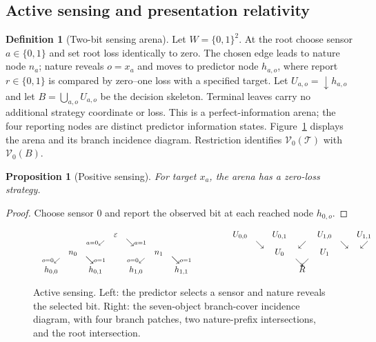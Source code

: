 \documentclass[11pt]{article}
\theoremstyle{plain}
\newtheorem{proposition}[theorem]{Proposition}
\theoremstyle{definition}
\newtheorem{definition}[theorem]{Definition}
\theoremstyle{remark}
\begin{document}
\subsection{Active sensing and presentation relativity}

\begin{definition}[Two-bit sensing arena]\label{def:sensing}
Let $W=\{0,1\}^2$. At the root choose sensor $a\in\{0,1\}$ and set root loss
identically to zero. The chosen edge leads to nature node $n_a$; nature reveals
$o=x_a$ and moves to predictor node
$h_{a,o}$, where report $r\in\{0,1\}$ is compared by zero--one loss with a
specified target. Let
$U_{a,o}=\downarrow h_{a,o}$ and let
$B=\bigcup_{a,o}U_{a,o}$ be the decision skeleton. Terminal leaves carry no
additional strategy coordinate or loss. This is a perfect-information arena; the
four reporting nodes are distinct predictor information states. Figure~\ref{fig:sensing} displays the arena and its branch incidence diagram. Restriction identifies
$\mathscr V_0(\mathcal T)$ with $\mathscr V_0(B)$.
\end{definition}

\begin{proposition}[Positive sensing]\label{prop:sensing-positive}
For target $x_a$, the arena has a zero-loss strategy.
\end{proposition}

\begin{proof}
Choose sensor $0$ and report the observed bit at each reached node $h_{0,o}$.
\end{proof}

\begin{figure}[htbp]
\centering
\[
\begin{array}{c@{\qquad\qquad}c}
\begin{array}{ccccccc}
&&&\varepsilon&&&\\[-1mm]
&&\scriptstyle a=0\swarrow&&\searrow\scriptstyle a=1&&\\
&n_0&&&&n_1&\\[-1mm]
\scriptstyle o=0\swarrow&&\searrow\scriptstyle o=1&&
\scriptstyle o=0\swarrow&&\searrow\scriptstyle o=1\\
h_{0,0}&&h_{0,1}&&h_{1,0}&&h_{1,1}
\end{array}
&
\begin{array}{ccccccc}
U_{0,0}&&U_{0,1}&&U_{1,0}&&U_{1,1}\\
&\searrow&&\swarrow& &\searrow&\swarrow\\[-1mm]
&&U_0&&U_1&&\\
&&&\searrow\!\!\swarrow&&&\\[-1mm]
&&&R&&&
\end{array}
\end{array}
\]
\caption{Active sensing. Left: the predictor selects a sensor and nature reveals
the selected bit. Right: the seven-object branch-cover incidence diagram, with
four branch patches, two nature-prefix intersections, and the root intersection.}
\label{fig:sensing}
\end{figure}
\end{document}
